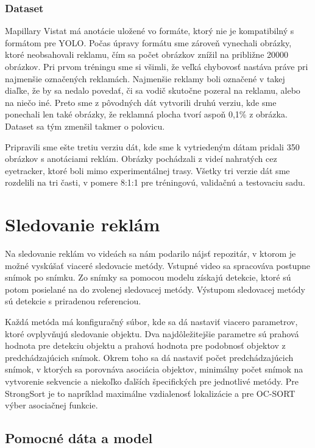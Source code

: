 \subsubsection{Dataset}

Mapillary Vistat má anotácie uložené vo formáte, ktorý nie je kompatibilný s formátom pre YOLO. Počas úpravy formátu sme zároveň vynechali obrázky, ktoré neobsahovali reklamu, čím sa počet obrázkov znížil na približne 20000 obrázkov. Pri prvom tréningu sme si všimli, že veľká chybovosť nastáva práve pri najmenšie označených reklamách. Najmenšie reklamy boli označené v takej diaľke, že by sa nedalo povedať, či sa vodič skutočne pozeral na reklamu, alebo na niečo iné. Preto sme z pôvodných dát vytvorili druhú verziu, kde sme ponechali len také obrázky, že reklamná plocha tvorí aspoň 0,1\% z obrázka. Dataset sa tým zmenšil takmer o polovicu. 

Pripravili sme ešte tretiu verziu dát, kde sme k vytriedeným dátam pridali 350 obrázkov s anotáciami reklám. Obrázky pochádzali z videí nahratých cez eyetracker, ktoré boli mimo experimentálnej trasy. Všetky tri verzie dát sme rozdelili na tri časti, v pomere 8:1:1 pre tréningovú, validačnú a testovaciu sadu. 

\section{Sledovanie reklám}

Na sledovanie reklám vo videách sa nám podarilo nájsť repozitár, v ktorom je možné vyskúšať viaceré sledovacie metódy. Vstupné video sa spracováva postupne snímok po snímku. Zo snímky sa pomocou modelu získajú detekcie, ktoré sú potom posielané na do zvolenej sledovacej metódy. Výstupom sledovacej metódy sú detekcie s priradenou referenciou.

Každá metóda má konfiguračný súbor, kde sa dá nastaviť viacero parametrov, ktoré ovplyvňujú sledovanie objektu. Dva najdôležitejšie parametre sú prahová hodnota pre detekciu objektu a prahová hodnota pre podobnosť objektov z predchádzajúcich snímok. Okrem toho sa dá nastaviť počet predchádzajúcich snímok, v ktorých sa porovnáva asociácia objektov, minimálny počet snímok na vytvorenie sekvencie a niekoľko ďalších špecifických pre jednotlivé metódy. Pre StrongSort je to napríklad maximálne vzdialenosť lokalizácie a pre OC-SORT výber asociačnej funkcie.

\subsection{Pomocné dáta a model}

